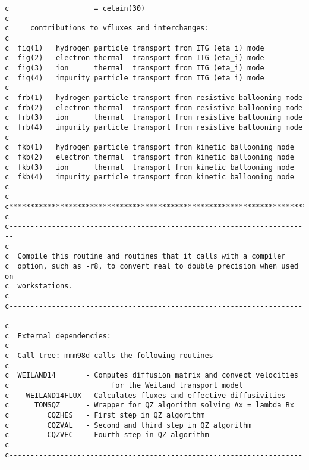 \begin{verbatim}
c                    = cetain(30)
c
c     contributions to vfluxes and interchanges: 
c
c  fig(1)   hydrogen particle transport from ITG (eta_i) mode
c  fig(2)   electron thermal  transport from ITG (eta_i) mode
c  fig(3)   ion      thermal  transport from ITG (eta_i) mode
c  fig(4)   impurity particle transport from ITG (eta_i) mode
c
c  frb(1)   hydrogen particle transport from resistive ballooning mode
c  frb(2)   electron thermal  transport from resistive ballooning mode
c  frb(3)   ion      thermal  transport from resistive ballooning mode
c  frb(4)   impurity particle transport from resistive ballooning mode
c
c  fkb(1)   hydrogen particle transport from kinetic ballooning mode
c  fkb(2)   electron thermal  transport from kinetic ballooning mode
c  fkb(3)   ion      thermal  transport from kinetic ballooning mode
c  fkb(4)   impurity particle transport from kinetic ballooning mode
c
c
c***********************************************************************
c
c-----------------------------------------------------------------------
c
c  Compile this routine and routines that it calls with a compiler 
c  option, such as -r8, to convert real to double precision when used on 
c  workstations.
c
c-----------------------------------------------------------------------
c
c  External dependencies:
c
c  Call tree: mmm98d calls the following routines
c
c  WEILAND14       - Computes diffusion matrix and convect velocities
c                        for the Weiland transport model
c    WEILAND14FLUX - Calculates fluxes and effective diffusivities
c      TOMSQZ      - Wrapper for QZ algorithm solving Ax = lambda Bx
c         CQZHES   - First step in QZ algorithm 
c         CQZVAL   - Second and third step in QZ algorithm
c         CQZVEC   - Fourth step in QZ algorithm
c
c-----------------------------------------------------------------------


\end{verbatim}
